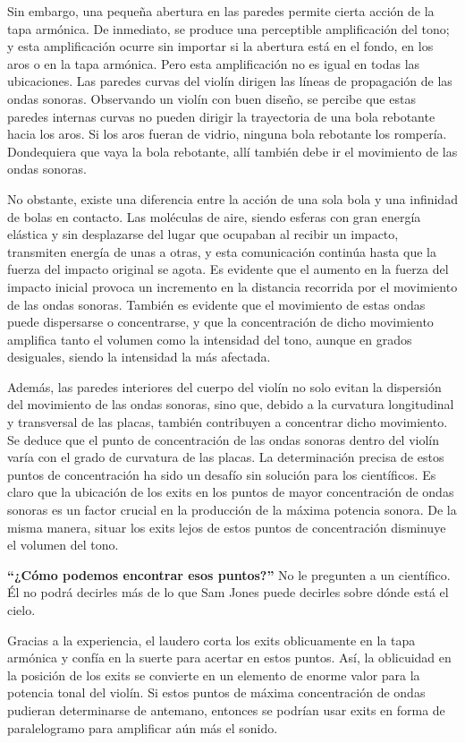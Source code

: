 \documentclass[12pt]{book}
\begin{document}
Sin embargo, una pequeña abertura en las paredes permite cierta acción de la tapa armónica. De inmediato, se produce una perceptible amplificación del tono; y esta amplificación ocurre sin importar si la abertura está en el fondo, en los aros o en la tapa armónica. Pero esta amplificación no es igual en todas las ubicaciones. Las paredes curvas del violín dirigen las líneas de propagación de las ondas sonoras. Observando un violín con buen diseño, se percibe que estas paredes internas curvas no pueden dirigir la trayectoria de una bola rebotante hacia los aros. Si los aros fueran de vidrio, ninguna bola rebotante los rompería. Dondequiera que vaya la bola rebotante, allí también debe ir el movimiento de las ondas sonoras. 

No obstante, existe una diferencia entre la acción de una sola bola y una infinidad de bolas en contacto. Las moléculas de aire, siendo esferas con gran energía elástica y sin desplazarse del lugar que ocupaban al recibir un impacto, transmiten energía de unas a otras, y esta comunicación continúa hasta que la fuerza del impacto original se agota. Es evidente que el aumento en la fuerza del impacto inicial provoca un incremento en la distancia recorrida por el movimiento de las ondas sonoras. También es evidente que el movimiento de estas ondas puede dispersarse o concentrarse, y que la concentración de dicho movimiento amplifica tanto el volumen como la intensidad del tono, aunque en grados desiguales, siendo la intensidad la más afectada. 

Además, las paredes interiores del cuerpo del violín no solo evitan la dispersión del movimiento de las ondas sonoras, sino que, debido a la curvatura longitudinal y transversal de las placas, también contribuyen a concentrar dicho movimiento. Se deduce que el punto de concentración de las ondas sonoras dentro del violín varía con el grado de curvatura de las placas. La determinación precisa de estos puntos de concentración ha sido un desafío sin solución para los científicos. Es claro que la ubicación de los exits en los puntos de mayor concentración de ondas sonoras es un factor crucial en la producción de la máxima potencia sonora. De la misma manera, situar los exits lejos de estos puntos de concentración disminuye el volumen del tono.

\textbf{“¿Cómo podemos encontrar esos puntos?”}  
No le pregunten a un científico.  
Él no podrá decirles más de lo que Sam Jones puede decirles sobre dónde está el cielo.

Gracias a la experiencia, el laudero corta los exits oblicuamente en la tapa armónica y confía en la suerte para acertar en estos puntos. Así, la oblicuidad en la posición de los exits se convierte en un elemento de enorme valor para la potencia tonal del violín. Si estos puntos de máxima concentración de ondas pudieran determinarse de antemano, entonces se podrían usar exits en forma de paralelogramo para amplificar aún más el sonido.
\end{document}
